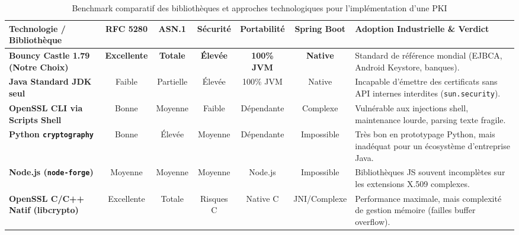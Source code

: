 \documentclass[12pt,a4paper]{report}
\begin{document}
\begin{table}[H]
\centering
\small
\begin{tabularx}{\textwidth}{l c c c c c X}
\toprule
\textbf{Technologie / Bibliothèque} & \textbf{RFC 5280} & \textbf{ASN.1} & \textbf{Sécurité} & \textbf{Portabilité} & \textbf{Spring Boot} & \textbf{Adoption Industrielle \& Verdict} \\
\midrule
\textbf{Bouncy Castle 1.79 (Notre Choix)} & \textbf{Excellente} & \textbf{Totale} & \textbf{Élevée} & \textbf{100\% JVM} & \textbf{Native} & Standard de référence mondial (EJBCA, Android Keystore, banques). \\
\addlinespace
\textbf{Java Standard JDK seul} & Faible & Partielle & Élevée & 100\% JVM & Native & Incapable d'émettre des certificats sans API internes interdites (\texttt{sun.security}). \\
\addlinespace
\textbf{OpenSSL CLI via Scripts Shell} & Bonne & Moyenne & Faible & Dépendante & Complexe & Vulnérable aux injections shell, maintenance lourde, parsing texte fragile. \\
\addlinespace
\textbf{Python \texttt{cryptography}} & Bonne & Élevée & Moyenne & Dépendante & Impossible & Très bon en prototypage Python, mais inadéquat pour un écosystème d'entreprise Java. \\
\addlinespace
\textbf{Node.js (\texttt{node-forge})} & Moyenne & Moyenne & Moyenne & Node.js & Impossible & Bibliothèques JS souvent incomplètes sur les extensions X.509 complexes. \\
\addlinespace
\textbf{OpenSSL C/C++ Natif (libcrypto)} & Excellente & Totale & Risques C & Native C & JNI/Complexe & Performance maximale, mais complexité de gestion mémoire (failles buffer overflow). \\
\bottomrule
\end{tabularx}
\caption{Benchmark comparatif des bibliothèques et approches technologiques pour l'implémentation d'une PKI}
\label{tab:benchmark_crypto}
\end{table}
\end{document}

